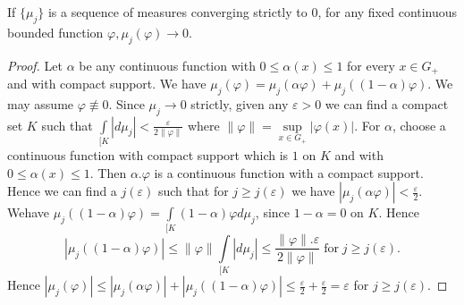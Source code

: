 \setcounter{section}{17}
\setcounter{lemma}{0}
\begin{lemma}\label{chap17:lem17.1}
If $\{\mu_j\}$ is a sequence of measures converging strictly to $0$,
for any fixed continuous bounded function $\varphi, \mu_j (\varphi)
\to 0$.
\end{lemma}
\begin{proof}
Let $\alpha$ be any continuous function with $0 \leq \alpha(x) \leq 1$
for every $x \in G_+$ and with compact support. We have $\mu_j
(\varphi)= \mu_j(\alpha \varphi) + \mu_j((1-\alpha)\varphi)$. We may
assume $\varphi \nequiv 0$. Since $\mu_j \to 0$ strictly, given any
$\varepsilon > 0$ we can find a compact set $K$ such that
$\int\limits_{[K} |d\mu_j| <
  \frac{\varepsilon}{2\parallel\varphi\parallel}$ where
  $\parallel\varphi\parallel= \underset{x\in
    G_+}{\sup}|\varphi(x)|$. For $\alpha$, choose a continuous
  function with compact support which is $1$ on $K$ and with $0 \leq
  \alpha(x)\leq 1$. Then $\alpha . \varphi$ is a continuous function
  with a compact support. Hence we can find a $j(\varepsilon)$ such
  that for $j \geq j(\varepsilon)$ we have $|\mu_j(\alpha \varphi)| <
  \frac{\varepsilon}{2}$. We\pageoriginale have $\mu_j((1-\alpha)
  \varphi) = \int\limits_{[K} (1-\alpha) \varphi d \mu_j$, since
    $1-\alpha = 0$ on $K$. Hence 
$$
|\mu_j ((1-\alpha)\varphi)| \leq \parallel \varphi \parallel
\int\limits_{[K} |d \mu_j| \leq \frac{\parallel \varphi \parallel.
 \varepsilon}{2\parallel\varphi\parallel}\; \text{for}\; j \geq j(\varepsilon).
$$   
Hence $|\mu_j(\varphi)| \leq | \mu_j (\alpha
\varphi)|+|\mu_j((1-\alpha)\varphi)| \leq \frac{\varepsilon}{2} +
\frac{\varepsilon}{2} = \varepsilon$ for $j \geq j(\varepsilon)$.
\end{proof}

